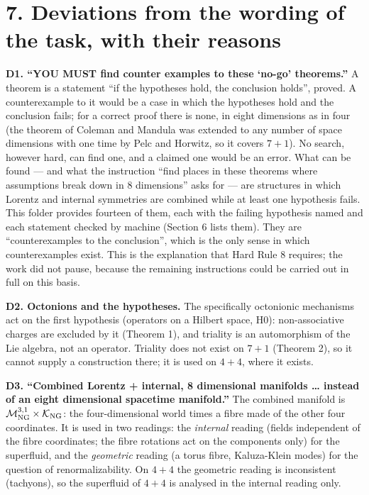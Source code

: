 \documentclass[
  10pt,
]{article}
\begin{document}
\hypertarget{deviations-from-the-wording-of-the-task-with-their-reasons}{%
\section{7. Deviations from the wording of the task, with their
reasons}\label{deviations-from-the-wording-of-the-task-with-their-reasons}}

\textbf{D1. ``YOU MUST find counter examples to these `no-go'
theorems.''} A theorem is a statement ``if the hypotheses hold, the
conclusion holds'', proved. A counterexample to it would be a case in
which the hypotheses hold and the conclusion fails; for a correct proof
there is none, in eight dimensions as in four (the theorem of Coleman
and Mandula was extended to any number of space dimensions with one time
by Pelc and Horwitz, so it covers \(7+1\)). No search, however hard, can
find one, and a claimed one would be an error. What can be found --- and
what the instruction ``find places in these theorems where assumptions
break down in 8 dimensions'' asks for --- are structures in which
Lorentz and internal symmetries are combined while at least one
hypothesis fails. This folder provides fourteen of them, each with the
failing hypothesis named and each statement checked by machine (Section
6 lists them). They are ``counterexamples to the conclusion'', which is
the only sense in which counterexamples exist. This is the explanation
that Hard Rule 8 requires; the work did not pause, because the remaining
instructions could be carried out in full on this basis.

\textbf{D2. Octonions and the hypotheses.} The specifically octonionic
mechanisms act on the first hypothesis (operators on a Hilbert space,
H0): non-associative charges are excluded by it (Theorem 1), and
triality is an automorphism of the Lie algebra, not an operator.
Triality does not exist on \(7+1\) (Theorem 2), so it cannot supply a
construction there; it is used on \(4+4\), where it exists.

\textbf{D3. ``Combined Lorentz + internal, 8 dimensional manifolds
\ldots{} instead of an eight dimensional spacetime manifold.''} The
combined manifold is
\(\mathcal M^{3,1}_{\rm NG}\times\mathcal K_{\rm NG}\): the
four-dimensional world times a fibre made of the other four coordinates.
It is used in two readings: the \emph{internal} reading (fields
independent of the fibre coordinates; the fibre rotations act on the
components only) for the superfluid, and the \emph{geometric} reading (a
torus fibre, Kaluza-Klein modes) for the question of renormalizability.
On \(4+4\) the geometric reading is inconsistent (tachyons), so the
superfluid of \(4+4\) is analysed in the internal reading only.
\end{document}
